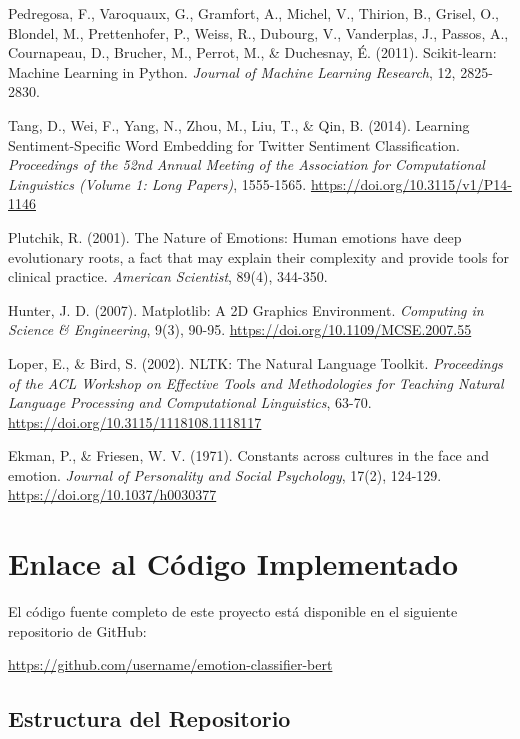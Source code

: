 \documentclass[12pt,a4paper]{report}
\begin{document}
\begin{thebibliography}{99}
 Pedregosa, F., Varoquaux, G., Gramfort, A., Michel, V., Thirion, B., Grisel, O., Blondel, M., Prettenhofer, P., Weiss, R., Dubourg, V., Vanderplas, J., Passos, A., Cournapeau, D., Brucher, M., Perrot, M., \& Duchesnay, É. (2011). Scikit-learn: Machine Learning in Python. \textit{Journal of Machine Learning Research}, 12, 2825-2830.

 Tang, D., Wei, F., Yang, N., Zhou, M., Liu, T., \& Qin, B. (2014). Learning Sentiment-Specific Word Embedding for Twitter Sentiment Classification. \textit{Proceedings of the 52nd Annual Meeting of the Association for Computational Linguistics (Volume 1: Long Papers)}, 1555-1565. \url{https://doi.org/10.3115/v1/P14-1146}

 Plutchik, R. (2001). The Nature of Emotions: Human emotions have deep evolutionary roots, a fact that may explain their complexity and provide tools for clinical practice. \textit{American Scientist}, 89(4), 344-350.

 Hunter, J. D. (2007). Matplotlib: A 2D Graphics Environment. \textit{Computing in Science \& Engineering}, 9(3), 90-95. \url{https://doi.org/10.1109/MCSE.2007.55}

 Loper, E., \& Bird, S. (2002). NLTK: The Natural Language Toolkit. \textit{Proceedings of the ACL Workshop on Effective Tools and Methodologies for Teaching Natural Language Processing and Computational Linguistics}, 63-70. \url{https://doi.org/10.3115/1118108.1118117}

 Ekman, P., \& Friesen, W. V. (1971). Constants across cultures in the face and emotion. \textit{Journal of Personality and Social Psychology}, 17(2), 124-129. \url{https://doi.org/10.1037/h0030377}

\end{thebibliography}

\chapter{Enlace al Código Implementado}

El código fuente completo de este proyecto está disponible en el siguiente repositorio de GitHub:

\url{https://github.com/username/emotion-classifier-bert}

\section{Estructura del Repositorio}
\end{document}
